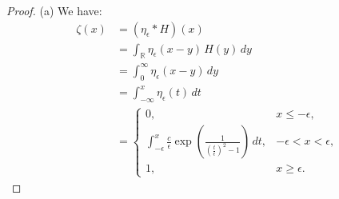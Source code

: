 \documentclass[10pt,oneside,openany]{memoir}
\begin{document}
	\begin{proof}
		(a) We have:
\begin{align*}
\zeta(x) &= (\eta_\epsilon * H)(x) \\
&= \int_{\mathbb{R}} \eta_\epsilon(x-y)\,H(y)\,dy \\
&= \int_0^\infty \eta_\epsilon(x-y)\,dy \\
&= \int_{-\infty}^x \eta_\epsilon(t)\,dt \\[6pt]
&=
\begin{cases}
0, & x \le -\epsilon, \\[6pt]
\displaystyle \int_{-\epsilon}^{x} \frac{c}{\epsilon}\exp\!\left(\frac{1}{\left(\frac{t}{\epsilon}\right)^2 - 1}\right)\,dt,
& -\epsilon < x < \epsilon, \\[10pt]
1, & x \ge \epsilon.
\end{cases}
\end{align*}
	\end{proof}





\end{document}
